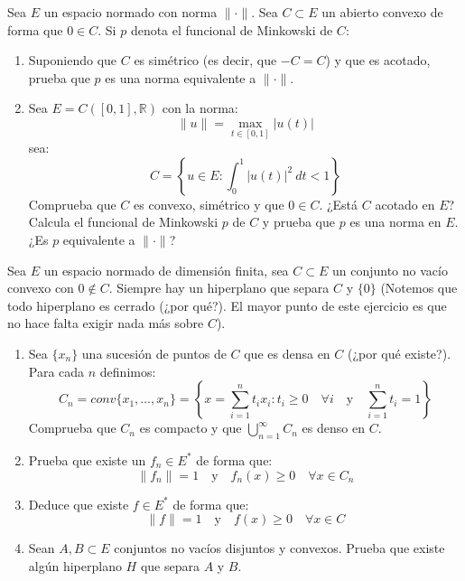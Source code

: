 \begin{ejercicio} %
    Sea $E$ un espacio normado con norma $\|\cdot \|$. Sea $C\subset E$ un abierto convexo de forma que $0\in C$. Si $p$ denota el funcional de Minkowski de $C$:
    \begin{enumerate}[label=\alph*)]
        \item Suponiendo que $C$ es simétrico (es decir, que $-C=C$) y que es acotado, prueba que $p$ es una norma equivalente a $\|\cdot \|$.
        \item Sea $E = C([0,1], \mathbb{R})$ con la norma:
            \begin{equation*}
                \|u\| = \max_{t\in [0,1]}|u(t)|
            \end{equation*}
            sea:
            \begin{equation*}
                C = \left\{u\in E: \int_{0}^{1} |u(t)|^2~dt < 1 \right\}
            \end{equation*}
            Comprueba que $C$ es convexo, simétrico y que $0\in C$. ¿Está $C$ acotado en $E$? Calcula el funcional de Minkowski $p$ de $C$ y prueba que $p$ es una norma en $E$. ¿Es $p$ equivalente a $\|\cdot \|$?
    \end{enumerate}
\end{ejercicio}

\begin{ejercicio}%
    Sea $E$ un espacio normado de dimensión finita, sea $C\subset E$ un conjunto no vacío convexo con $0\notin C$. Siempre hay un hiperplano que separa $C$ y $\{0\}$ (Notemos que todo hiperplano es cerrado (¿por qué?). El mayor punto de este ejercicio es que no hace falta exigir nada más sobre $C$).
    \begin{enumerate}[label=\alph*)]
        \item Sea $\{x_n\}$ una sucesión de puntos de $C$ que es densa en $C$ (¿por qué existe?). Para cada $n$ definimos:
            \begin{equation*}
                C_n = conv\{x_1, \ldots, x_n\} = \left\{x=\sum_{i=1}^{n}t_ix_i : t_i\geq 0 \quad \forall i \quad \text{y}\quad \sum_{i=1}^{n}t_i = 1 \right\}
            \end{equation*}
            Comprueba que $C_n$ es compacto y que $\bigcup\limits_{n=1}^\infty C_n$ es denso en $C$.
        \item Prueba que existe un $f_n \in E^\ast$ de forma que:
            \begin{equation*}
                \|f_n\| = 1 \quad \text{y}\quad f_n(x) \geq 0 \quad \forall x\in C_n
            \end{equation*}
        \item Deduce que existe $f\in E^\ast$ de forma que:
            \begin{equation*}
                \|f\| = 1 \quad \text{y}\quad f(x)\geq 0 \quad \forall x\in C
            \end{equation*}
        \item Sean $A,B\subset E$ conjuntos no vacíos disjuntos y convexos. Prueba que existe algún hiperplano $H$ que separa $A$ y $B$.
    \end{enumerate}
\end{ejercicio}

